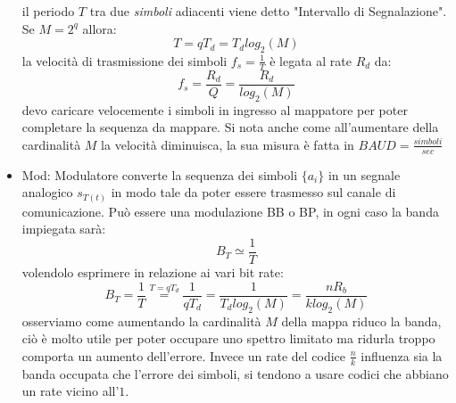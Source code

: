 \begin{itemize}
{\begin{figure}[H]
{\begin{tikzpicture}
                    \end{tikzpicture}
                }
                \hfill
            \end{figure}
            il periodo $T$ tra due \emph{simboli} adiacenti viene detto "Intervallo di Segnalazione". Se $M=2^q$ allora:
            \[
                T = qT_d =T_d log_{2}(M)  
            \]
            la velocità di trasmissione dei simboli $f_s = \frac{1}{T}$ è legata al rate $R_d$ da:
            \[
                f_s = \frac{R_d}{Q} = \frac{R_d}{log_{2}(M)} 
            \] 
            devo caricare velocemente i simboli in ingresso al mappatore per poter completare la sequenza da mappare. Si nota anche come
            all'aumentare della cardinalità $M$ la velocità diminuisca, la sua misura è fatta in $BAUD = \frac{simboli}{sec}$
        }
        \item {Mod: Modulatore converte la sequenza dei simboli $\{a_i\}$ in un segnale analogico $s_{T(t)}$ in modo tale da poter essere trasmesso  
            sul canale di comunicazione. Può essere una modulazione {\color{blue}BB} o {\color{red}BP}, in ogni caso la banda impiegata sarà:
            \[
                B_T \simeq \frac{1}{T}  
            \]
            volendolo esprimere in relazione ai vari bit rate:
            \[
                B_T = \frac{1}{T} \overset{T = qT_d}{=} \frac{1}{qT_d} = \frac{1}{T_d log_2(M)} = \frac{nR_b}{klog_2(M)}     
            \]
            osserviamo come aumentando la cardinalità $M$ della mappa riduco la banda, ciò è molto utile per poter occupare uno spettro limitato ma ridurla troppo
            comporta un aumento dell'errore. Invece un rate del codice $\frac{n}{k}$ influenza sia la banda occupata che l'errore dei simboli, si tendono 
            a usare codici che abbiano un rate vicino all'$1$. 
        }
    \end{itemize}
